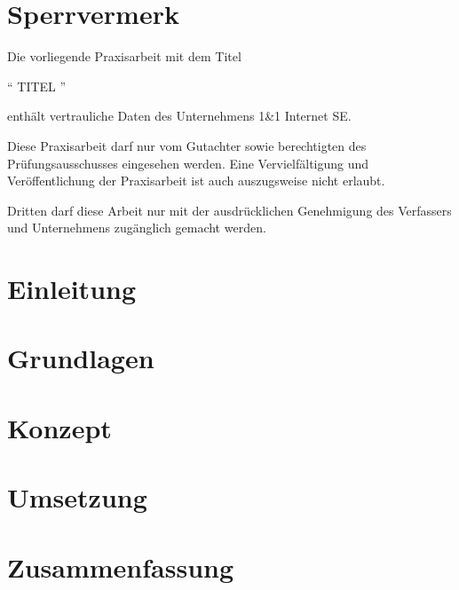 \documentclass[fontsize=12pt,DIV=11,BCOR=4mm,fleqn]{scrartcl}
\begin{document}
	\pagebreak{}
	\clearpage
	\vspace*{2.1cm}
	\section*{Sperrvermerk}
		Die vorliegende Praxisarbeit mit dem Titel 
		
		\begin{center}
			"` TITEL "'
		\end{center}
		
		enthält vertrauliche Daten des Unternehmens 1\&1 Internet SE. \vspace{5pt}
	
		Diese Praxisarbeit darf nur vom Gutachter sowie berechtigten des Prüfungsausschusses eingesehen werden. Eine Vervielfältigung und Veröffentlichung der Praxisarbeit ist auch auszugsweise nicht erlaubt. \vspace{5pt}
	
		Dritten darf diese Arbeit nur mit der ausdrücklichen Genehmigung des Verfassers und Unternehmens zugänglich gemacht werden.
	
	\pagebreak{}
	\clearpage
	\vspace*{0.1cm}
	\tableofcontents{} \thispagestyle{empty} 
	
	\pagebreak{}
	\clearpage
	\clearscrheadings
	\cfoot{\pagemark}
	\setcounter{page}{5} 
	\vspace*{2.5cm}
	\listoffigures{}
	
	\pagebreak{}
	\vspace*{2.5cm}
	\listoftables{}
	
	\pagebreak{}
	\clearscrheadings
	\cfoot{\pagemark}
	\setcounter{page}{1} 
	
	\section{Einleitung}
		
		\pagebreak{}
	\section{Grundlagen}
		
		\pagebreak{}
	\section{Konzept}
		
		\pagebreak{}
	\section{Umsetzung}
		
		\pagebreak{}
	\section{Zusammenfassung}
		
		
\end{document}
